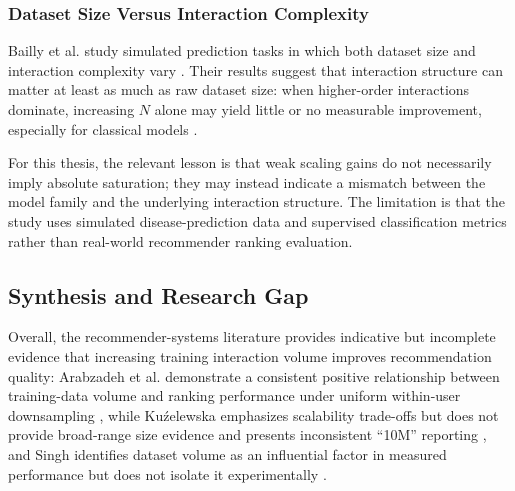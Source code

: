 \documentclass[12pt,a4paper]{article}
\begin{document}
\subsubsection{Dataset Size Versus Interaction Complexity}
Bailly et al. study simulated prediction tasks in which both dataset size and interaction complexity vary \cite{bailly2022}. Their results suggest that interaction structure can matter at least as much as raw dataset size: when higher-order interactions dominate, increasing $N$ alone may yield little or no measurable improvement, especially for classical models \cite{bailly2022}.

For this thesis, the relevant lesson is that weak scaling gains do not necessarily imply absolute saturation; they may instead indicate a mismatch between the model family and the underlying interaction structure. The limitation is that the study uses simulated disease-prediction data and supervised classification metrics rather than real-world recommender ranking evaluation.

\subsection{Synthesis and Research Gap}
Overall, the recommender-systems literature provides indicative but incomplete evidence that increasing training interaction volume improves recommendation quality: Arabzadeh et al. demonstrate a consistent positive relationship between training-data volume and ranking performance under uniform within-user downsampling \cite{arabzadeh2025}, while Kuźelewska emphasizes scalability trade-offs but does not provide broad-range size evidence and presents inconsistent ``10M'' reporting \cite{kuzelewska2020}, and Singh identifies dataset volume as an influential factor in measured performance but does not isolate it experimentally \cite{singh2020}.
\end{document}
